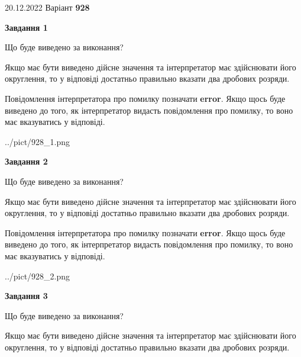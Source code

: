 \documentclass[12pt, ukrainian]{article}
\begin{document}
{20.12.2022 Варіант \No \textbf { 928 }\par}
{
\begin {Large}

{\begin {center}\textbf{Завдання 1}\end {center}}\par
Що буде виведено за виконання? \par

Якщо має бути виведено дійсне значення та інтерпретатор має здійснювати його округлення, 
то у відповіді достатньо правильно вказати два дробових розряди.

Повідомлення інтерпретатора про помилку позначати \textbf{error}.
Якщо щось буде виведено до того, як інтерпретатор видасть повідомлення про помилку, 
то воно має вказуватись у відповіді. \par

\begin{center}
	{../pict/928_1.png}
\end{center}
\newpage

{\begin {center}\textbf{Завдання 2}\end {center}}\par
Що буде виведено за виконання? \par

Якщо має бути виведено дійсне значення та інтерпретатор має здійснювати його округлення, 
то у відповіді достатньо правильно вказати два дробових розряди.

Повідомлення інтерпретатора про помилку позначати \textbf{error}.
Якщо щось буде виведено до того, як інтерпретатор видасть повідомлення про помилку, 
то воно має вказуватись у відповіді. \par

\begin{center}
	{../pict/928_2.png}
\end{center}
\newpage

{\begin {center}\textbf{Завдання 3}\end {center}}\par
Що буде виведено за виконання? \par

Якщо має бути виведено дійсне значення та інтерпретатор має здійснювати його округлення, 
то у відповіді достатньо правильно вказати два дробових розряди.


\end{Large}}
\end{document}
